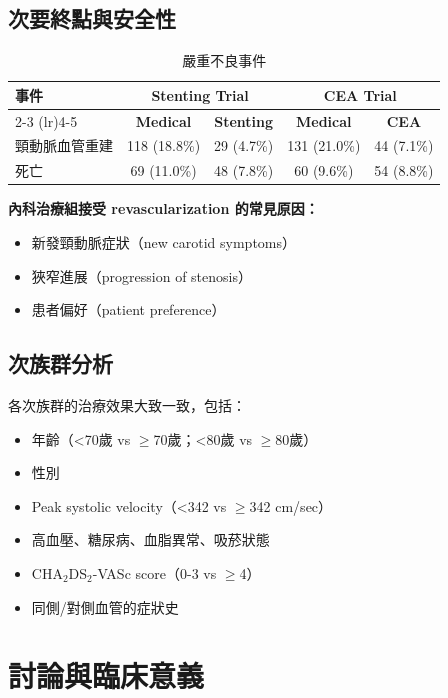 \documentclass[12pt,a4paper]{article}
\begin{document}
\subsection{次要終點與安全性}

\begin{longtable}{p{5cm}cccc}
\caption{嚴重不良事件} \\
\toprule
\multirow{2}{*}{\textbf{事件}} & \multicolumn{2}{c}{\textbf{Stenting Trial}} & \multicolumn{2}{c}{\textbf{CEA Trial}} \\
\cmidrule(lr){2-3} \cmidrule(lr){4-5}
& \textbf{Medical} & \textbf{Stenting} & \textbf{Medical} & \textbf{CEA} \\
\midrule
\endfirsthead

\bottomrule
\endfoot

頸動脈血管重建 & 118 (18.8\%) & 29 (4.7\%) & 131 (21.0\%) & 44 (7.1\%) \\
死亡 & 69 (11.0\%) & 48 (7.8\%) & 60 (9.6\%) & 54 (8.8\%) \\
\bottomrule
\end{longtable}

\textbf{內科治療組接受 revascularization 的常見原因：}
\begin{itemize}
    \item 新發頸動脈症狀（new carotid symptoms）
    \item 狹窄進展（progression of stenosis）
    \item 患者偏好（patient preference）
\end{itemize}

\subsection{次族群分析}

各次族群的治療效果大致一致，包括：
\begin{itemize}
    \item 年齡（<70歲 vs $\geq$70歲；<80歲 vs $\geq$80歲）
    \item 性別
    \item Peak systolic velocity（<342 vs $\geq$342 cm/sec）
    \item 高血壓、糖尿病、血脂異常、吸菸狀態
    \item CHA$_2$DS$_2$-VASc score（0-3 vs $\geq$4）
    \item 同側/對側血管的症狀史
\end{itemize}

\section{討論與臨床意義}
\end{document}
